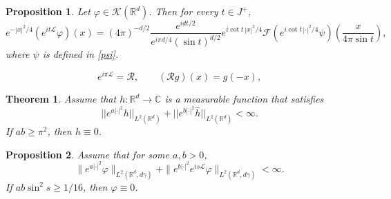 \documentclass[10pt,a4paper]{amsart}
\newtheorem{proposition}{Proposition}
\newtheorem{theorem}{Theorem}
\newcommand{\Rm}{\mathbb R^d}
\def \vf{\varphi}
\begin{document}
\begin{proposition}\label{P:semigroup}
Let $\vf\in\mathscr K(\Rm)$. Then for every $t\in J^+$,
\begin{equation}\label{final}
e^{-|x|^2/4}\left(e^{it\mathscr L}\vf\right)(x)
=(4\pi)^{-d/2}\frac{e^{idt/2}}{e^{i\pi d/4}(\sin t)^{d/2}}
 e^{i\cot t\,|x|^2/4}
\mathscr F\!\left(e^{i\cot t\,|\cdot|^2/4}\psi\right)
\left(\frac{x}{4\pi\sin t}\right),
\end{equation}
where $\psi$ is defined in \eqref{psi}.
\end{proposition}

\begin{equation}\label{parity-pre}
e^{i\pi\mathscr L}=\mathcal R,\qquad (\mathcal R g)(x)=g(-x),
\end{equation}

\begin{theorem}\label{T:har2}
Assume that $h:\Rm\to \mathbb C$ is a measurable function that satisfies 
\begin{equation}\label{hardyL2}
||e^{a|\cdot|^2} h||_{L^2(\Rm)} + ||e^{b|\cdot|^2} \hat h||_{L^2(\Rm)}<\infty.
\end{equation}
If $a b\ge \pi^2$, then $h\equiv 0$.  
\end{theorem} 

\begin{proposition}\label{P:main}
Assume that for some $a,b>0$,
\begin{equation}\label{L2}
\|e^{a|\cdot|^2}\vf\|_{L^2(\Rm,d\gamma)}
+\|e^{b|\cdot|^2}e^{is\mathscr L}\vf\|_{L^2(\Rm,d\gamma)}<\infty.
\end{equation}
If $ab\sin^2s\ge1/16$, then $\vf\equiv0$.
\end{proposition}
\end{document}
